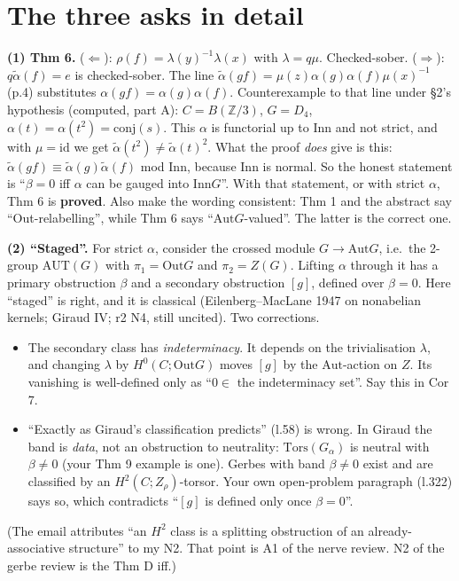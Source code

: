\documentclass[11pt]{article}
\newcommand{\Z}{\mathbb{Z}}
\newcommand{\Inn}{\mathrm{Inn}}
\newcommand{\Out}{\mathrm{Out}}
\newcommand{\Aut}{\mathrm{Aut}}
\newcommand{\conj}{\mathrm{conj}}
\begin{document}
\section{The three asks in detail}
\textbf{(1) Thm 6.} ($\Leftarrow$): $\rho(f)=\lambda(y)^{-1}\lambda(x)$ with $\lambda=q\mu$.
Checked-sober. ($\Rightarrow$): $q\tilde\alpha(f)=e$ is checked-sober. The line
$\tilde\alpha(gf)=\mu(z)\alpha(g)\alpha(f)\mu(x)^{-1}$ (p.4) substitutes $\alpha(gf)=\alpha(g)\alpha(f)$.
Counterexample to that line under §2's hypothesis (computed, part A): $C=B(\Z/3)$, $G=D_4$,
$\alpha(t)=\alpha(t^2)=\conj(s)$. This $\alpha$ is functorial up to Inn and not strict, and with
$\mu=\mathrm{id}$ we get $\tilde\alpha(t^2)\neq\tilde\alpha(t)^2$. What the proof \emph{does} give
is this: $\tilde\alpha(gf)\equiv\tilde\alpha(g)\tilde\alpha(f)$ mod $\Inn$, because $\Inn$ is
normal. So the honest statement is ``$\beta=0$ iff $\alpha$ can be gauged into $\Inn G$''. With
that statement, or with strict $\alpha$, Thm 6 is \textbf{proved}. Also make the wording
consistent: Thm 1 and the abstract say ``Out-relabelling'', while Thm 6 says ``$\Aut G$-valued''.
The latter is the correct one.

\textbf{(2) ``Staged''.} For strict $\alpha$, consider the crossed module $G\to\Aut G$, i.e.\ the
2-group $\mathrm{AUT}(G)$ with $\pi_1=\Out G$ and $\pi_2=Z(G)$. Lifting $\alpha$ through it has a
primary obstruction $\beta$ and a secondary obstruction $[g]$, defined over $\beta=0$. Here
``staged'' is right, and it is classical (Eilenberg--MacLane 1947 on nonabelian kernels; Giraud IV;
r2 N4, still uncited). Two corrections.
\begin{itemize}[leftmargin=1.2em]
\item The secondary class has \emph{indeterminacy}. It depends on the trivialisation $\lambda$,
and changing $\lambda$ by $H^0(C;\Out G)$ moves $[g]$ by the $\Aut$-action on $Z$. Its vanishing is
well-defined only as ``$0\in$ the indeterminacy set''. Say this in Cor 7.
\item ``Exactly as Giraud's classification predicts'' (l.58) is wrong. In Giraud the band is
\emph{data}, not an obstruction to neutrality: $\mathrm{Tors}(G_\alpha)$ is neutral with $\beta\neq0$
(your Thm 9 example is one). Gerbes with band $\beta\neq0$ exist and are classified by an
$H^2(C;Z_\rho)$-torsor. Your own open-problem paragraph (l.322) says so, which contradicts ``$[g]$
is defined only once $\beta=0$''.
\end{itemize}
(The email attributes ``an $H^2$ class is a splitting obstruction of an already-associative
structure'' to my N2. That point is A1 of the nerve review. N2 of the gerbe review is the Thm D
iff.)
\end{document}
